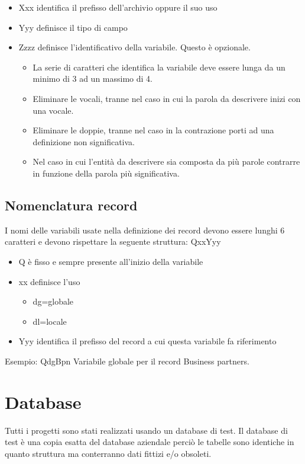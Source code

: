 \documentclass[target=bach,aauheader=,style=]{thud}
\begin{document}
\begin{itemize}
    \item Xxx identifica il prefisso dell'archivio oppure il suo uso

    \item Yyy definisce il tipo di campo

    \item Zzzz definisce l'identificativo della variabile. Questo è opzionale.
    \begin{itemize}
        \item La serie di caratteri che identifica la variabile deve essere lunga da un minimo di 3 ad un massimo di 4.
        \item Eliminare le vocali, tranne nel caso in cui la parola da descrivere inizi con una vocale.
        \item Eliminare le doppie, tranne nel caso in la contrazione porti ad una definizione non significativa.
        \item Nel caso in cui l’entità da descrivere sia composta da più parole contrarre in funzione della parola più
        significativa.
    \end{itemize}
\end{itemize}


\subsection{Nomenclatura record}
I nomi delle variabili usate nella definizione dei record devono essere lunghi 6 caratteri e devono rispettare la
seguente struttura:
QxxYyy
\begin{itemize}
    \item Q è fisso e sempre presente all'inizio della variabile

    \item xx definisce l'uso
    \begin{itemize}
        \item dg=globale
        \item dl=locale
    \end{itemize}
    \item Yyy identifica il prefisso del record a cui questa variabile fa riferimento
\end{itemize}
Esempio: QdgBpn Variabile globale per il record Business partners.

\section{Database}
Tutti i progetti sono stati realizzati usando un database di test.
Il database di test è una copia esatta del database aziendale perciò le tabelle sono identiche in quanto struttura ma conterranno dati fittizi e/o obsoleti.
\end{document}
